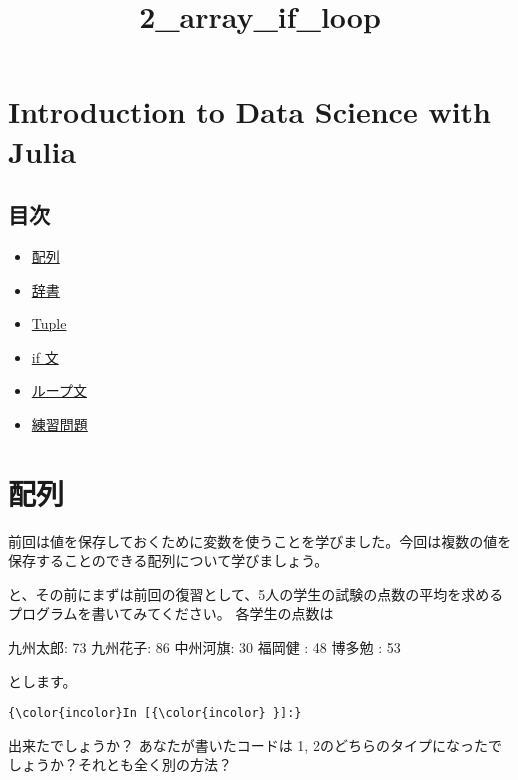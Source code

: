 \documentclass[a4paper,dvipdfmx,uplatex]{jsarticle}
\title{2\_array\_if\_loop}
\providecommand{\tightlist}{%
      \setlength{\itemsep}{0pt}\setlength{\parskip}{0pt}}
\begin{document}
    
    
    \maketitle
    
    

    
    \section{Introduction to Data Science with
Julia}\label{introduction-to-data-science-with-julia}

\subsection{目次}\label{ux76eeux6b21}

\begin{itemize}
\tightlist
\item
  \protect\hyperlink{ux914dux5217}{配列}
\item
  \protect\hyperlink{ux8f9eux66f8}{辞書}
\item
  \protect\hyperlink{Tuple}{Tuple}
\item
  \protect\hyperlink{if-ux6587}{if 文}
\item
  \protect\hyperlink{ux30ebux30fcux30d7ux6587}{ループ文}
\item
  \protect\hyperlink{ux7df4ux7fd2ux554fux984c}{練習問題}
\end{itemize}

    \section{配列}\label{ux914dux5217}

前回は値を保存しておくために変数を使うことを学びました。今回は複数の値を保存することのできる配列について学びましょう。

と、その前にまずは前回の復習として、5人の学生の試験の点数の平均を求めるプログラムを書いてみてください。
各学生の点数は

九州太郎: 73 九州花子: 86 中州河旗: 30 福岡健 : 48 博多勉 : 53

とします。

    \begin{Verbatim}[commandchars=\\\{\}]
{\color{incolor}In [{\color{incolor} }]:} 
\end{Verbatim}

    

    出来たでしょうか？ あなたが書いたコードは 1,
2のどちらのタイプになったでしょうか？それとも全く別の方法？
\end{document}
